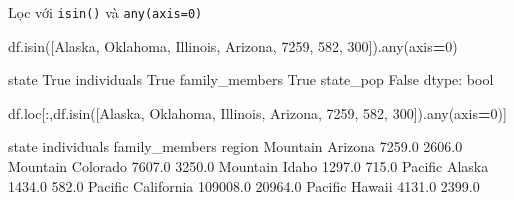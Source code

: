 \documentclass[
]{book}
\newenvironment{Shaded}{\begin{snugshade}}{\end{snugshade}}
\newcommand{\BuiltInTok}[1]{#1}
\newcommand{\DecValTok}[1]{\textcolor[rgb]{0.00,0.00,0.81}{#1}}
\newcommand{\NormalTok}[1]{#1}
\newcommand{\OperatorTok}[1]{\textcolor[rgb]{0.81,0.36,0.00}{\textbf{#1}}}
\newcommand{\StringTok}[1]{\textcolor[rgb]{0.31,0.60,0.02}{#1}}
\begin{document}
Lọc với \texttt{isin()} và \texttt{any(axis=0)}

\begin{Shaded}
\begin{Highlighting}[]
\NormalTok{df.isin([}\StringTok{\textquotesingle{}Alaska\textquotesingle{}}\NormalTok{, }\StringTok{\textquotesingle{}Oklahoma\textquotesingle{}}\NormalTok{, }\StringTok{\textquotesingle{}Illinois\textquotesingle{}}\NormalTok{, }\StringTok{\textquotesingle{}Arizona\textquotesingle{}}\NormalTok{, }\DecValTok{7259}\NormalTok{, }\DecValTok{582}\NormalTok{, }\DecValTok{300}\NormalTok{]).}\BuiltInTok{any}\NormalTok{(axis}\OperatorTok{=}\DecValTok{0}\NormalTok{)}
\end{Highlighting}
\end{Shaded}

\begin{Shaded}
\begin{Highlighting}[]
\NormalTok{state              True}
\NormalTok{individuals        True}
\NormalTok{family\_members     True}
\NormalTok{state\_pop         False}
\NormalTok{dtype: bool}
\end{Highlighting}
\end{Shaded}

\begin{Shaded}
\begin{Highlighting}[]
\NormalTok{df.loc[:,df.isin([}\StringTok{\textquotesingle{}Alaska\textquotesingle{}}\NormalTok{, }\StringTok{\textquotesingle{}Oklahoma\textquotesingle{}}\NormalTok{, }\StringTok{\textquotesingle{}Illinois\textquotesingle{}}\NormalTok{, }\StringTok{\textquotesingle{}Arizona\textquotesingle{}}\NormalTok{, }\DecValTok{7259}\NormalTok{, }\DecValTok{582}\NormalTok{, }\DecValTok{300}\NormalTok{]).}\BuiltInTok{any}\NormalTok{(axis}\OperatorTok{=}\DecValTok{0}\NormalTok{)]}
\end{Highlighting}
\end{Shaded}

\begin{Shaded}
\begin{Highlighting}[]
\NormalTok{               state  individuals  family\_members}
\NormalTok{region                                           }
\NormalTok{Mountain     Arizona       7259.0          2606.0}
\NormalTok{Mountain    Colorado       7607.0          3250.0}
\NormalTok{Mountain       Idaho       1297.0           715.0}
\NormalTok{Pacific       Alaska       1434.0           582.0}
\NormalTok{Pacific   California     109008.0         20964.0}
\NormalTok{Pacific       Hawaii       4131.0          2399.0}
\end{Highlighting}
\end{Shaded}
\end{document}
